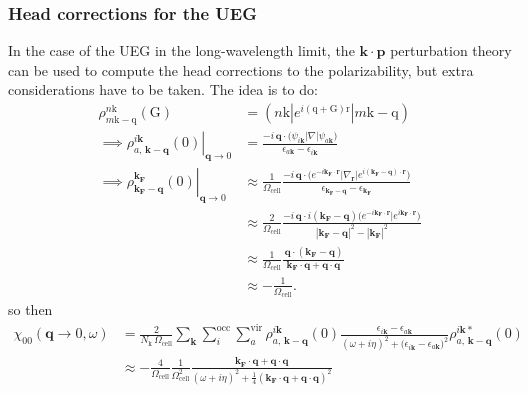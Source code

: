 \subsubsection{Head corrections for the UEG}
In the case of the UEG in the long-wavelength limit, the $ \mathbf{k}\cdot\mathbf{p} $ perturbation theory can be used to compute the head corrections to the polarizability, but extra considerations have to be taken. The idea is to do:
\begin{align}
\rho_{m \mathrm{k}-\mathrm{q}}^{n \mathrm{k}}(\mathrm{G})&=\left(n \mathrm{k}\left|e^{i(\mathrm{q}+\mathrm{G}) \mathrm{r}}\right| m \mathrm{k}-\mathrm{q}\right) \\
    \implies \left.\rho_{a,\,\mathbf{k}-\mathbf{q}}^{i\mathbf{k}}(0)\right|_{\mathbf{q} \rightarrow 0}
  &= \frac{-i\,\mathbf{q}\cdot
          \bigl(\psi_{i\mathbf{k}}\lvert\nabla\rvert\psi_{a\mathbf{k}}\bigr)}
         {\epsilon_{a\mathbf{k}}-\epsilon_{i\mathbf{k}}}\\
\implies     \left.\rho_{\mathbf{k_F}-\mathbf{q}}^{\mathbf{k_F}}(0)\right|_{\mathbf{q} \rightarrow 0}
  &\approx \frac{1}{\Omega_{\text{cell}}}\frac{-i\,\mathbf{q}\cdot
          \bigl(e^{-i\mathbf{k_F}\cdot\mathbf{r}}\lvert\nabla_{\bm{r}}\rvert e^{i\left(\mathbf{k_F}-\bm{q}\right)\cdot\mathbf{r}}\bigr)}
         {\epsilon_{\mathbf{k_F}-\mathbf{q}}-\epsilon_{\mathbf{k_F}}}\\
&\approx \frac{2}{\Omega_{\text{cell}}}\frac{-i\,\mathbf{q}\cdot i\left(\mathbf{k_F}-\mathbf{q}\right)
          \bigl(e^{-i\mathbf{k_F}\cdot\mathbf{r}}| e^{i\mathbf{k_F}\cdot\mathbf{r}}\bigr)}
         {|\bm{\mathbf{k_F}-\mathbf{q}}|^2-|\mathbf{k_F}|^2}\\
&\approx \frac{1}{\Omega_{\text{cell}}}\frac{\,\mathbf{q}\cdot \left(\mathbf{k_F}-\mathbf{q}\right)
          }
         {\mathbf{k_F}\cdot \mathbf{q}+\mathbf{q}\cdot \mathbf{q}}\\
&\approx -\frac{1}{\Omega_{\text{cell}}}.
\end{align}
so then
\begin{align}
\chi_{00}(\mathbf{q} \rightarrow 0, \omega)
  &= \frac{2}{N_{\mathrm{k}}\,\Omega_{\text{cell}}}
     \sum_{\mathbf{k}}
     \sum_i^{\text{occ}}
     \sum_a^{\text{vir}}
     \rho_{a,\,\mathbf{k}-\mathbf{q}}^{i\mathbf{k}}(0)
     \frac{\epsilon_{i\mathbf{k}}-\epsilon_{a\mathbf{k}}}
          {\left(\omega+i\eta\right)^2+\bigl(\epsilon_{i\mathbf{k}}-\epsilon_{a\mathbf{k}}\bigr)^2}
     \rho_{a,\,\mathbf{k}-\mathbf{q}}^{i\mathbf{k}*}(0)\\
&\approx -\frac{4}{\Omega_{\text{cell}}} \frac{1}{\Omega_{\text{cell}}^2}\frac{\bm{k_F}\cdot \mathbf{q}+\mathbf{q}\cdot \mathbf{q}}{\left(\omega+i\eta\right)^2+\frac{1}{4}\left(\bm{k_F}\cdot \mathbf{q}+\mathbf{q}\cdot \mathbf{q}\right)^2}\\
\end{align}
